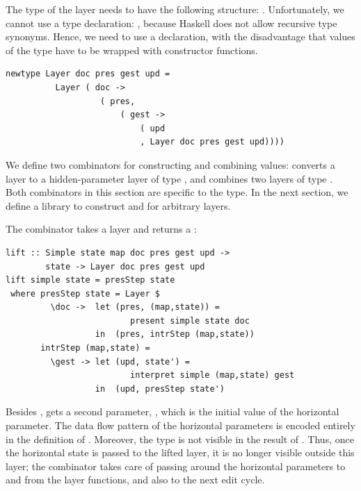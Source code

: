 \documentclass[preprint,natbib]{sigplanconf}
\begin{document}
The type of the layer needs to have the following structure: 
.  Unfortunately, we cannot use a type declaration: , because Haskell does not allow recursive type synonyms. Hence, we need to use a  declaration, with the disadvantage that values of the type have to be wrapped with constructor functions.

\begin{small}
\begin{verbatim}
newtype Layer doc pres gest upd = 
          Layer ( doc -> 
                   ( pres, 
                       ( gest -> 
                           ( upd 
                           , Layer doc pres gest upd))))
\end{verbatim}
\end{small}

We define two combinators for constructing and combining  values:  converts  a  layer to a hidden-parameter layer of type , and  combines two layers of type . Both combinators in this section are specific to the  type. In the next section, we define a library to construct  and  for arbitrary layers.



The combinator  takes a  layer and returns a :

\begin{small}
\begin{verbatim}
lift :: Simple state map doc pres gest upd ->
        state -> Layer doc pres gest upd
lift simple state = presStep state 
 where presStep state = Layer $
         \doc ->  let (pres, (map,state)) = 
                         present simple state doc                                         
                  in  (pres, intrStep (map,state))
       intrStep (map,state) =
         \gest -> let (upd, state') = 
                         interpret simple (map,state) gest                     
                  in  (upd, presStep state')
\end{verbatim}%
\end{small}

Besides ,  gets a second parameter, , which is the initial value of the horizontal parameter. The data flow pattern of the horizontal parameters is encoded entirely in the definition of . Moreover, the  type is not visible in the result of . Thus, once the horizontal state is passed to the lifted layer, it is no longer visible outside this layer; the  combinator takes care of passing around the horizontal parameters to and from the layer functions, and also to the next edit cycle. 
\end{document}
